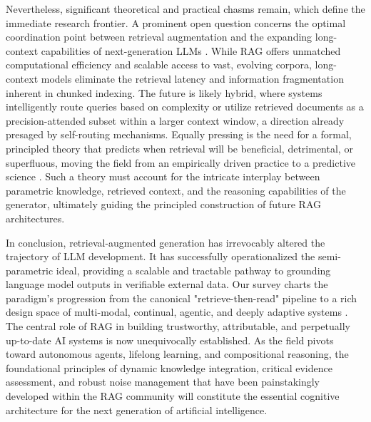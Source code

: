 \documentclass[11pt,a4paper]{article}
\begin{document}
Nevertheless, significant theoretical and practical chasms remain, which define the immediate research frontier. A prominent open question concerns the optimal coordination point between retrieval augmentation and the expanding long-context capabilities of next-generation LLMs \cite{arxiv:2407.16833v1}. While RAG offers unmatched computational efficiency and scalable access to vast, evolving corpora, long-context models eliminate the retrieval latency and information fragmentation inherent in chunked indexing. The future is likely hybrid, where systems intelligently route queries based on complexity or utilize retrieved documents as a precision-attended subset within a larger context window, a direction already presaged by self-routing mechanisms. Equally pressing is the need for a formal, principled theory that predicts when retrieval will be beneficial, detrimental, or superfluous, moving the field from an empirically driven practice to a predictive science \cite{arxiv:2402.13492v3,arxiv:2402.11457v1}. Such a theory must account for the intricate interplay between parametric knowledge, retrieved context, and the reasoning capabilities of the generator, ultimately guiding the principled construction of future RAG architectures.

In conclusion, retrieval-augmented generation has irrevocably altered the trajectory of LLM development. It has successfully operationalized the semi-parametric ideal, providing a scalable and tractable pathway to grounding language model outputs in verifiable external data. Our survey charts the paradigm's progression from the canonical "retrieve-then-read" pipeline to a rich design space of multi-modal, continual, agentic, and deeply adaptive systems \cite{arxiv:2210.02928v2,arxiv:2408.08921v2}. The central role of RAG in building trustworthy, attributable, and perpetually up-to-date AI systems is now unequivocally established. As the field pivots toward autonomous agents, lifelong learning, and compositional reasoning, the foundational principles of dynamic knowledge integration, critical evidence assessment, and robust noise management that have been painstakingly developed within the RAG community will constitute the essential cognitive architecture for the next generation of artificial intelligence.
\end{document}
